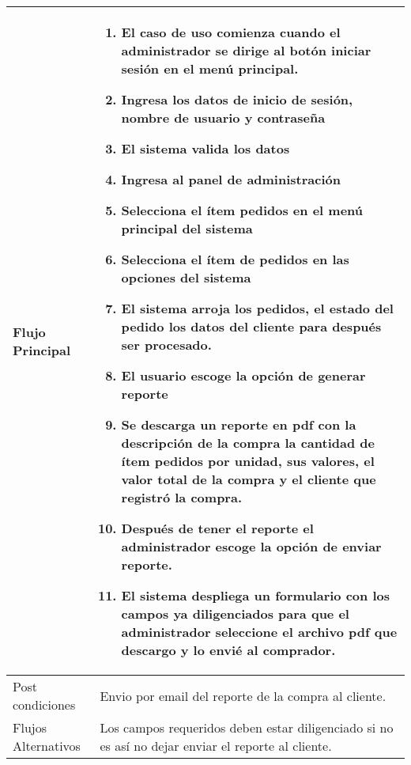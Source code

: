 \documentclass[12pt,a4paper]{article}
\begin{document}
    \newpage
    \begin{table}[h]
        \centering
        \begin{tabular}{| p{3cm}| p{11cm} |}
            \hline
        Flujo Principal     &    

            \begin{enumerate}
                \item El caso de uso comienza cuando el administrador se dirige al botón iniciar sesión en el menú principal.
                \item Ingresa los datos de inicio de sesión, nombre de usuario y contraseña
                \item El sistema valida los datos
                \item Ingresa al panel de administración
                \item Selecciona el ítem pedidos en el menú principal del sistema
                \item Selecciona el ítem de pedidos en las opciones del sistema
                \item El sistema arroja los pedidos, el estado del pedido los datos del cliente para después ser procesado.
                \item El usuario escoge la opción de generar reporte
                \item Se descarga un reporte en pdf con la descripción de la compra la cantidad de ítem pedidos por unidad, sus valores, el valor total de la compra y el cliente que registró la compra.
                \item Después de tener el reporte el administrador escoge la opción de enviar reporte.
                \item El sistema despliega un formulario con los campos ya diligenciados para que el administrador seleccione el archivo pdf que descargo y lo envié al comprador.
            \end{enumerate}
        \\  
        
        \hline
        Post condiciones    &  Envio por email del reporte de la compra al cliente.     \\  
        \hline
        Flujos Alternativos &  Los campos requeridos deben estar diligenciado si no es así no dejar enviar el reporte al cliente.     \\  
        \hline
        \end{tabular}
    \end{table}
\end{document}
